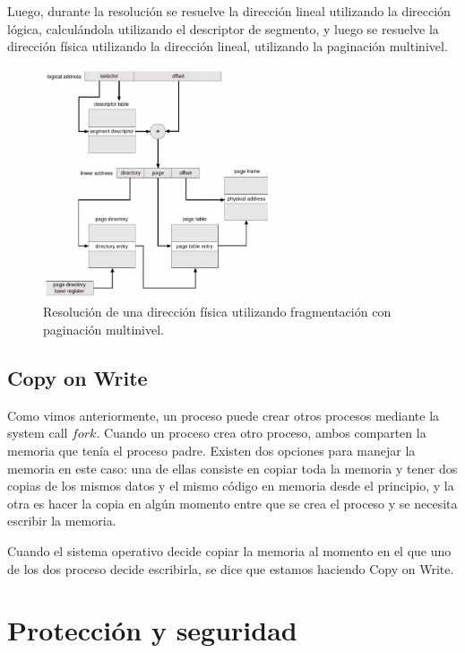 \documentclass{article}
\begin{document}
Luego, durante la resolución se resuelve la dirección lineal utilizando la dirección lógica, calculándola utilizando el descriptor de segmento, y luego se resuelve la dirección física utilizando la dirección lineal, utilizando la paginación multinivel.

\begin{figure}[H]
    \centering
    \includegraphics[width=0.6\textwidth]{imgs/memory_paged_segmentation.png}
    \caption{Resolución de una dirección física utilizando fragmentación con paginación multinivel.}
    \label{fig:memory_paged_segmentation}
\end{figure}

\subsection{Copy on Write}

Como vimos anteriormente, un proceso puede crear otros procesos mediante la system call $fork$. Cuando un proceso crea otro proceso, ambos comparten la memoria que ten\'ia el proceso padre. Existen dos opciones para manejar la memoria en este caso: una de ellas consiste en copiar toda la memoria y tener dos copias de los mismos datos y el mismo c\'odigo en memoria desde el principio, y la otra es hacer la copia en alg\'un momento entre que se crea el proceso y se necesita escribir la memoria.

Cuando el sistema operativo decide copiar la memoria al momento en el que uno de los dos proceso decide escribirla, se dice que estamos haciendo Copy on Write.

\section{Protección y seguridad}
\end{document}
